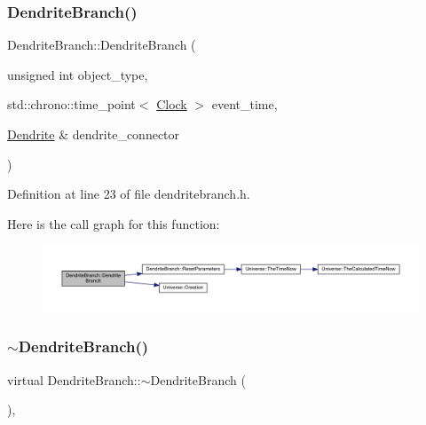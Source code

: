 \subsubsection{\texorpdfstring{Dendrite\+Branch()}{DendriteBranch()}\hspace{0.1cm}{\footnotesize\ttfamily [4/4]}}
{\footnotesize\ttfamily Dendrite\+Branch\+::\+Dendrite\+Branch (\begin{DoxyParamCaption}\item[{unsigned int}]{object\+\_\+type,  }\item[{std\+::chrono\+::time\+\_\+point$<$ \mbox{\hyperlink{universe_8h_a0ef8d951d1ca5ab3cfaf7ab4c7a6fd80}{Clock}} $>$}]{event\+\_\+time,  }\item[{\mbox{\hyperlink{class_dendrite}{Dendrite}} \&}]{dendrite\+\_\+connector }\end{DoxyParamCaption})\hspace{0.3cm}{\ttfamily [inline]}}



Definition at line 23 of file dendritebranch.\+h.

Here is the call graph for this function\+:\nopagebreak
\begin{figure}[H]
\begin{center}
\leavevmode
\includegraphics[width=350pt]{class_dendrite_branch_a9b7e932b0614dad370edd76f31900c40_cgraph}
\end{center}
\end{figure}
\mbox{\label{class_dendrite_branch_a38707cb6d1f9f07c6e8aa34a8a415051}} 
\subsubsection{\texorpdfstring{$\sim$\+Dendrite\+Branch()}{~DendriteBranch()}}
{\footnotesize\ttfamily virtual Dendrite\+Branch\+::$\sim$\+Dendrite\+Branch (\begin{DoxyParamCaption}{ }\end{DoxyParamCaption})\hspace{0.3cm}{\ttfamily [inline]}, {\ttfamily [virtual]}}


